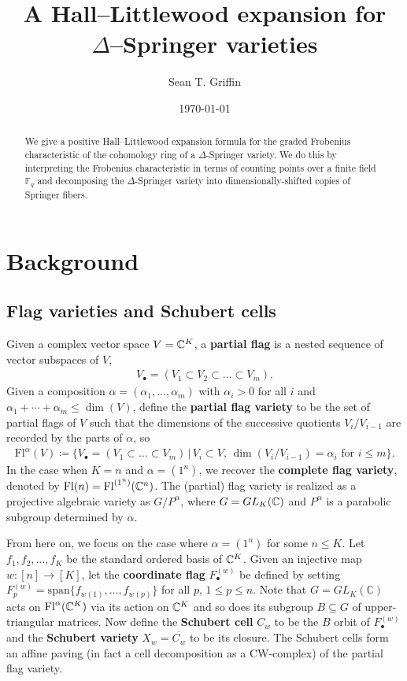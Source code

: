 \documentclass[11pt]{amsart}
\title{A Hall--Littlewood expansion for \\$\Delta$--Springer varieties}
\author{Sean T. Griffin}
\date{\today}
\theoremstyle{definition}
\newcommand{\st}{\,|\,}
\newcommand{\vspan}{\mathrm{span}}
\newcommand{\Fl}{\mathrm{Fl}}
\begin{document}
\maketitle


\begin{abstract}
    We give a positive Hall--Littlewood expansion formula for the graded Frobenius characteristic of the cohomology ring of a $\Delta$-Springer variety. We do this by interpreting the Frobenius characteristic in terms of counting points over a finite field $\mathbb{F}_q$ and decomposing the $\Delta$-Springer variety into dimensionally-shifted copies of Springer fibers.
\end{abstract}


\section{Background}\label{sec:Background}


\subsection{Flag varieties and Schubert cells}\label{subsec:Flags}

Given a complex vector space $V=\mathbb{C}^K$, a \textbf{partial flag} is a nested sequence of vector subspaces of $V$,
\begin{align}
    V_\bullet = (V_1\subset V_2\subset\dots\subset V_m).
\end{align}
Given a composition $\alpha = (\alpha_1,\dots, \alpha_m)$ with $\alpha_i>0$ for all $i$ and $\alpha_1+\cdots+\alpha_m \leq \dim(V)$,  define the \textbf{partial flag variety} to be the set of partial flags of $V$ such that the dimensions of the successive quotients $V_i/V_{i-1}$ are recorded by the parts of $\alpha$, so
\begin{align}
    \Fl^{\alpha}(V) \coloneqq \{V_\bullet = (V_1\subset\dots\subset V_m) \st  V_i\subset V,\, \dim(V_i/V_{i-1}) = \alpha_i\text{ for }i\leq m\}.
\end{align}
In the case when $K=n$ and $\alpha = (1^n)$, we recover the \textbf{complete flag variety}, denoted by $\Fl(n) = \Fl^{(1^n)}(\bC^n)$.  The (partial) flag variety is realized as a projective algebraic variety as $G/P^{\alpha}$, where $G=GL_K(\mathbb{C})$ and $P^\alpha$ is a parabolic subgroup determined by $\alpha$.

From here on, we focus on the case where $\alpha=(1^n)$ for some $n\leq K$.  Let $f_1,f_2,\dots,f_K$ be the standard ordered basis of $\mathbb{C}^K$.  Given an injective map $w:[n]\rightarrow[K]$, let the {\bf coordinate flag} $F_\bullet^{(w)}$ be defined by setting $F^{(w)}_p=\vspan\{f_{w(1)},\ldots, f_{w(p)}\}$ for all $p$, $1\leq p\leq n$.  Note that $G=GL_K(\mathbb{C})$ acts on $\Fl^\alpha(\bC^K)$ via its action on $\mathbb{C}^K$ and so does its subgroup $B\subseteq G$ of upper-triangular matrices.
Now define the {\bf Schubert cell} $C_w$ to be the $B$ orbit of $F^{(w)}_\bullet$ and the {\bf Schubert variety} $X_w=\overline{C_w}$ to be its closure.  The Schubert cells form an affine paving (in fact a cell decomposition as a CW-complex) of the partial flag variety.
\end{document}
